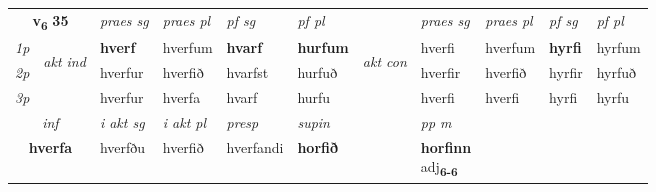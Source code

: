 \noindent
\begin{tabular}{lllllllllll} \toprule
\multicolumn{2}{c}{\textbf{v{\textsubscript{6}}} \Large{\textbf{35}}}  &  \textit{praes sg}  & \textit{praes pl}  &\textit{ pf sg} & \textit{pf pl} &  &  \textit{praes sg}  & \textit{praes pl}  & \textit{pf sg} & \textit{pf pl } \\*
	\cmidrule{3-6} \cmidrule{8-11}
 {\textit{1p}} & \multirow{3}{*}{\begin{turn}{90}\textit{akt ind}\end{turn}} & \textbf{hverf} & hverfum & \textbf{hvarf} & \textbf{hurfum} & \multirow{3}{*}{\begin{turn}{90}\textit{akt con}\end{turn}} &hverfi & hverfum & \textbf{hyrfi} & hyrfum\\*
 {\textit{2p}} &  &  hverfur  & hverfið & hvarfst & hurfuð & & hverfir & hverfið & hyrfir & hyrfuð \\*
{\textit{3p}} &  & hverfur & hverfa & hvarf & hurfu & & hverfi & hverfi& hyrfi & hyrfu \\*
\cmidrule{3-6} \cmidrule{8-11}

   \multicolumn{2}{c}{\textit{inf}}  & \textit{i akt sg} & \textit{i akt pl}   & \textit{presp} & \textit{supin}  && \textit{pp m} \\*
  \multicolumn{2}{c}{\textbf{hverfa}} & hverfðu  & hverfið   & hverfandi &  \textbf{horfið}  && \specialcell{\textbf{horfinn} \\ adj\textbf{\textsubscript{6-6}}} \\*
\end{tabular}

